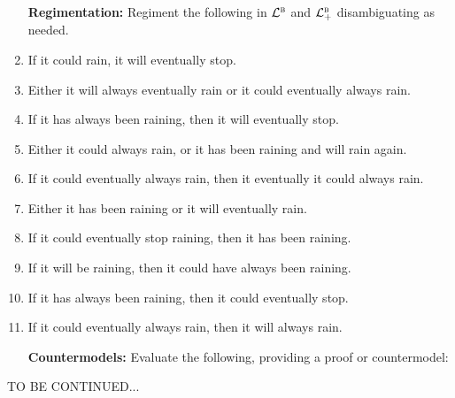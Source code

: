 \documentclass[a4paper, 11pt]{article} %
\begin{document}
\begin{enumerate}[leftmargin=1.2in,itemsep=1pt]\small
	\item[\bf Regimentation:] Regiment the following in $\mathcal{L}^{\textsc{b}}$ and $\mathcal{L}^{\textsc{b}}_+$ disambiguating as needed.
    \item If it could rain, it will eventually stop.
    \item Either it will always eventually rain or it could eventually always rain.
    \item If it has always been raining, then it will eventually stop.
    \item Either it could always rain, or it has been raining and will rain again.
    \item If it could eventually always rain, then it eventually it could always rain.
    \item Either it has been raining or it will eventually rain.
    \item If it could eventually stop raining, then it has been raining.
    \item If it will be raining, then it could have always been raining.
    \item If it has always been raining, then it could eventually stop.
    \item If it could eventually always rain, then it will always rain.
  \item[\bf Countermodels:] Evaluate the following, providing a proof or countermodel:
    \begin{enumerate}[label=\arabic*.,resume]\small
    \end{enumerate}
\end{enumerate}


\pagebreak
\noindent
TO BE CONTINUED...
\pagebreak
\end{document}
